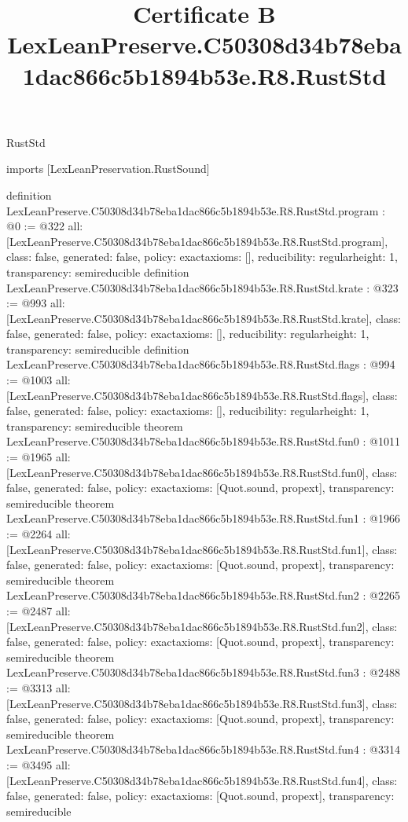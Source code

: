 \begin{lexlean}{RustStd}
\title{Certificate B LexLeanPreserve.C50308d34b78eba1dac866c5b1894b53e.R8.RustStd}
\begin{coremodule}
imports [LexLeanPreservation.RustSound]

definition LexLeanPreserve.C50308d34b78eba1dac866c5b1894b53e.R8.RustStd.program : @0 := @322 {
  all: [LexLeanPreserve.C50308d34b78eba1dac866c5b1894b53e.R8.RustStd.program],
  class: false,
  generated: false,
  policy: exact{axioms: []},
  reducibility: regular{height: 1},
  transparency: semireducible
}
definition LexLeanPreserve.C50308d34b78eba1dac866c5b1894b53e.R8.RustStd.krate : @323 := @993 {
  all: [LexLeanPreserve.C50308d34b78eba1dac866c5b1894b53e.R8.RustStd.krate],
  class: false,
  generated: false,
  policy: exact{axioms: []},
  reducibility: regular{height: 1},
  transparency: semireducible
}
definition LexLeanPreserve.C50308d34b78eba1dac866c5b1894b53e.R8.RustStd.flags : @994 := @1003 {
  all: [LexLeanPreserve.C50308d34b78eba1dac866c5b1894b53e.R8.RustStd.flags],
  class: false,
  generated: false,
  policy: exact{axioms: []},
  reducibility: regular{height: 1},
  transparency: semireducible
}
theorem LexLeanPreserve.C50308d34b78eba1dac866c5b1894b53e.R8.RustStd.fun0 : @1011 := @1965 {
  all: [LexLeanPreserve.C50308d34b78eba1dac866c5b1894b53e.R8.RustStd.fun0],
  class: false,
  generated: false,
  policy: exact{axioms: [Quot.sound, propext]},
  transparency: semireducible
}
theorem LexLeanPreserve.C50308d34b78eba1dac866c5b1894b53e.R8.RustStd.fun1 : @1966 := @2264 {
  all: [LexLeanPreserve.C50308d34b78eba1dac866c5b1894b53e.R8.RustStd.fun1],
  class: false,
  generated: false,
  policy: exact{axioms: [Quot.sound, propext]},
  transparency: semireducible
}
theorem LexLeanPreserve.C50308d34b78eba1dac866c5b1894b53e.R8.RustStd.fun2 : @2265 := @2487 {
  all: [LexLeanPreserve.C50308d34b78eba1dac866c5b1894b53e.R8.RustStd.fun2],
  class: false,
  generated: false,
  policy: exact{axioms: [Quot.sound, propext]},
  transparency: semireducible
}
theorem LexLeanPreserve.C50308d34b78eba1dac866c5b1894b53e.R8.RustStd.fun3 : @2488 := @3313 {
  all: [LexLeanPreserve.C50308d34b78eba1dac866c5b1894b53e.R8.RustStd.fun3],
  class: false,
  generated: false,
  policy: exact{axioms: [Quot.sound, propext]},
  transparency: semireducible
}
theorem LexLeanPreserve.C50308d34b78eba1dac866c5b1894b53e.R8.RustStd.fun4 : @3314 := @3495 {
  all: [LexLeanPreserve.C50308d34b78eba1dac866c5b1894b53e.R8.RustStd.fun4],
  class: false,
  generated: false,
  policy: exact{axioms: [Quot.sound, propext]},
  transparency: semireducible
}
\end{coremodule}
\end{lexlean}
